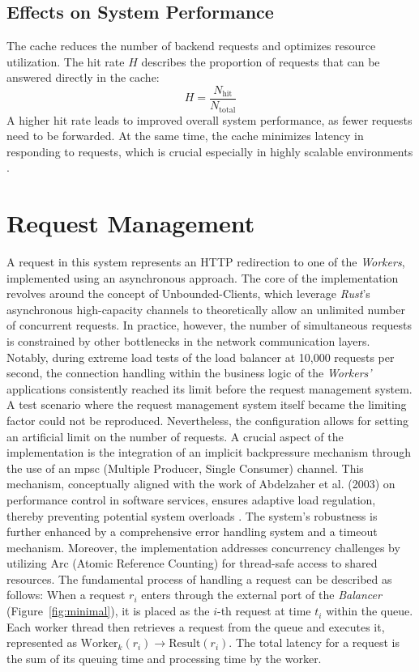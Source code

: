 \documentclass[twocolumn]{webofc}
\begin{document}
\subsection{Effects on System Performance}
The cache reduces the number of backend requests and optimizes resource utilization. The hit rate \( H \) describes the proportion of requests that can be answered directly in the cache:
\[
    H = \frac{N_{\text{hit}}}{N_{\text{total}}}
\]
A higher hit rate leads to improved overall system performance, as fewer requests need to be forwarded. At the same time, the cache minimizes latency in responding to requests, which is crucial especially in highly scalable environments \cite{tanenbaum2007distributed}.

\section{Request Management}
A request in this system represents an HTTP redirection to one of the \textit{Workers}, implemented using an asynchronous approach. The core of the implementation revolves around the concept of Unbounded-Clients, which leverage \textit{Rust}'s asynchronous high-capacity channels to theoretically allow an unlimited number of concurrent requests. In practice, however, the number of simultaneous requests is constrained by other bottlenecks in the network communication layers. Notably, during extreme load tests of the load balancer at 10,000 requests per second, the connection handling within the business logic of the \textit{Workers'} applications consistently reached its limit before the request management system. A test scenario where the request management system itself became the limiting factor could not be reproduced. Nevertheless, the configuration allows for setting an artificial limit on the number of requests. A crucial aspect of the implementation is the integration of an implicit backpressure mechanism through the use of an mpsc (Multiple Producer, Single Consumer) channel. This mechanism, conceptually aligned with the work of Abdelzaher et al. (2003) on performance control in software services, ensures adaptive load regulation, thereby preventing potential system overloads \cite{backpressure}. The system's robustness is further enhanced by a comprehensive error handling system and a timeout mechanism. Moreover, the implementation addresses concurrency challenges by utilizing Arc (Atomic Reference Counting) for thread-safe access to shared resources. The fundamental process of handling a request can be described as follows: When a request \( r_i \) enters through the external port of the \textit{Balancer} (Figure~\ref{fig:minimal}), it is placed as the \( i \)-th request at time \( t_i \) within the queue. Each worker thread then retrieves a request from the queue and executes it, represented as \( \text{Worker}_k(r_i) \rightarrow \text{Result}(r_i) \). The total latency for a request is the sum of its queuing time and processing time by the worker.
\end{document}

